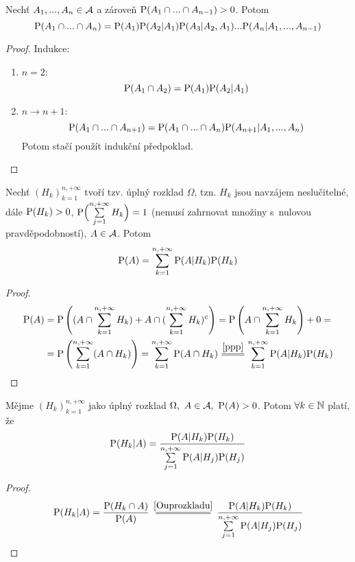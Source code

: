 \begin{theorem} Nechť $ A_1,...,A_n \in \mathcal{A} $ a zároveň $\mathrm{P}(A_1 \cap ... \cap A_{n-1})>0$. Potom
	\[
	\mathrm{P}(A_1 \cap... \cap A_n)=\mathrm{P}(A_1)\mathrm{P}(A_2|A_1)\mathrm{P}(A_3|A_2,A_1)...\mathrm{P}(A_n|A_1,...,A_{n-1})
	\] 
	\begin{proof} Indukce:
		\begin{enumerate}
			\item $n=2$:
			$$\mathrm{P}(A_1 \cap A_2)=\mathrm{P}(A_1)\mathrm{P}(A_2|A_1) $$
			\item $n \to n+1$: $$\mathrm{P}(A_1 \cap ... \cap A_{n+1})=\mathrm{P}(A_1 \cap ... \cap A_n)\mathrm{P}(A_{n+1}|A_1,...,A_n)$$
			Potom stačí použít indukční předpoklad. 
		\end{enumerate}	
	\end{proof}
\end{theorem}
\begin{theorem} 
	\label{Ouprozkladu}
	Nechť $(H_k)_{k=1}^{n,+\infty}$ tvoří tzv. úplný rozklad $\Omega$, tzn. $H_k$ jsou navzájem neslučitelné, dále $\mathrm{P}(H_k)>0$, $\mathrm{P}\Bigl({\sum\limits_{j=1}^{n,+\infty}H_k}\Bigr)=1$ (nemusí zahrnovat množiny s~nulovou pravděpodobností), $A \in \mathcal{A} $. Potom 
	\[
	\mathrm{P}(A) = \sum\limits_{k=1}^{n,+\infty}\mathrm{P}(A|H_k)\mathrm{P}(H_k)
	\]
	\begin{proof}
	\[
	\begin{split}
	\PP(A) &=\PP\left((A \cap \sum\limits_{k=1}^{n,+\infty}H_k)+A \cap (\sum\limits_{k=1}^{n,+\infty}H_k)^c \right)=\PP\left(A \cap \sum\limits_{k=1}^{n,+\infty}H_k \right)+0 = \\  &=\PP\left(\sum\limits_{k=1}^{n,+\infty}(A \cap H_k)\right)  =
		\sum\limits_{k=1}^{n,+\infty}\PP(A \cap H_k)  \equal{\ref{ppp}}\sum\limits_{k=1}^{n,+\infty}\PP(A|H_k)\PP(H_k)
	\end{split}
	\]
	\end{proof}
\end{theorem}

\begin{theorem}[Bayesova,1763] 
	Mějme $(H_k)_{k=1}^{n,+\infty}$ jako úplný rozklad $\Omega,~A \in \mathcal{A} , ~\mathrm{P}(A)>0$. Potom $\forall k\in\mathbb{N}$ platí, že 
	\[
	\mathrm{P}(H_k|A)=\frac{\mathrm{P}(A|H_k)\mathrm{P}(H_k)}{\sum\limits_{j=1}^{n,+\infty}\mathrm{P}(A|H_j)\mathrm{P}(H_j)}
	\]
	\begin{proof}
		$$\PP(H_k|A)=\frac{\PP(H_k\cap A)}{\PP(A)}\equal{\ref{Ouprozkladu}}\frac{\PP(A|H_k)\PP(H_k)}{\sum\limits_{j=1}^{n,+\infty}\PP(A|H_j)\PP(H_j)}$$
	\end{proof}
\end{theorem}

